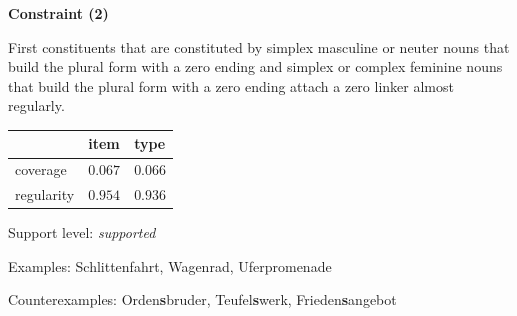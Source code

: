 \vspace{0.4em}

\begin{center}
\textbf{Constraint (2)}
\end{center}

\noindent
First constituents that are constituted by simplex masculine or neuter nouns that build the plural form with a zero ending and simplex or complex feminine nouns that build the plural form with a zero ending attach a zero linker almost regularly.
\vspace{0.5em}


\vspace{-0.25em}

\begin{table}[!ht]
\begin{center}
\setlength{\extrarowheight}{1pt}
\begin{tabularx}{\columnwidth}{|X|X|X|}
\hline
 & item & type \\
\hline
 coverage & $0.067$ & $0.066$ \\
\hline
 regularity & $0.954$ & $0.936$ \\
\hline
\end{tabularx}
\end{center}
\end{table}

\vspace{-1.35em}

\noindent
Support level: \textit{supported}

\vspace{0.3em}

\noindent
Examples: Schlitten{\zeroLinker}fahrt, Wagen{\zeroLinker}rad, Ufer{\zeroLinker}promenade

\noindent
Counterexamples: Orden\textbf{s}bruder, Teufel\textbf{s}werk, Frieden\textbf{s}angebot

\vspace{0.3em}

